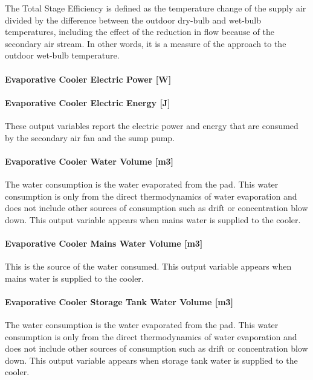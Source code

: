 The Total Stage Efficiency is defined as the temperature change of the supply air divided by the difference between the outdoor dry-bulb and wet-bulb temperatures, including the effect of the reduction in flow because of the secondary air stream. In other words, it is a measure of the approach to the outdoor wet-bulb temperature.

\paragraph{Evaporative Cooler Electric Power {[}W{]}}\label{evaporative-cooler-electric-power-w}

\paragraph{Evaporative Cooler Electric Energy {[}J{]}}\label{evaporative-cooler-electric-energy-j-3}

These output variables report the electric power and energy that are consumed by the secondary air fan and the sump pump.

\paragraph{Evaporative Cooler Water Volume {[}m3{]}}\label{evaporative-cooler-water-volume-m3-2}

The water consumption is the water evaporated from the pad. This water consumption is only from the direct thermodynamics of water evaporation and does not include other sources of consumption such as drift or concentration blow down. This output variable appears when mains water is supplied to the cooler.

\paragraph{Evaporative Cooler Mains Water Volume {[}m3{]}}\label{evaporative-cooler-mains-water-volume-m3-3}

This is the source of the water consumed. This output variable appears when mains water is supplied to the cooler.

\paragraph{Evaporative Cooler Storage Tank Water Volume {[}m3{]}}\label{evaporative-cooler-storage-tank-water-volume-m3-3}

The water consumption is the water evaporated from the pad. This water consumption is only from the direct thermodynamics of water evaporation and does not include other sources of consumption such as drift or concentration blow down. This output variable appears when storage tank water is supplied to the cooler.

